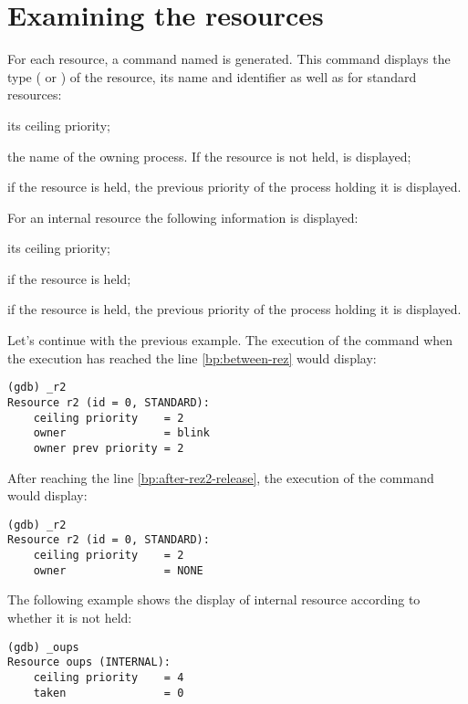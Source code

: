 \section{Examining the resources}

For each resource, a command named  is generated. This command displays the type ( or ) of the resource, its name and identifier as well as for standard resources:

\begin{pitemize}
\item its ceiling priority;
\item the name of the owning process. If the resource is not held,  is displayed;
\item if the resource is held, the previous priority of the process holding it is displayed.
\end{pitemize}

For an internal resource the following information is displayed:

\begin{pitemize}
\item its ceiling priority;
\item if the resource is held;
\item if the resource is held, the previous priority of the process holding it is displayed.
\end{pitemize}

Let's continue with the previous example. The execution of the command  when the execution has reached the line \ref{bp:between-rez} would display:

\begin{lstlisting}
(gdb) _r2
Resource r2 (id = 0, STANDARD):
	ceiling priority    = 2
	owner               = blink
	owner prev priority = 2
\end{lstlisting} 

After reaching the line \ref{bp:after-rez2-release}, the execution of the command  would display:

\begin{lstlisting}
(gdb) _r2
Resource r2 (id = 0, STANDARD):
	ceiling priority    = 2
	owner               = NONE
\end{lstlisting} 

The following example shows the display of internal resource  according to whether it is not held:

\begin{lstlisting}
(gdb) _oups 
Resource oups (INTERNAL):
	ceiling priority    = 4
	taken               = 0
\end{lstlisting} 

